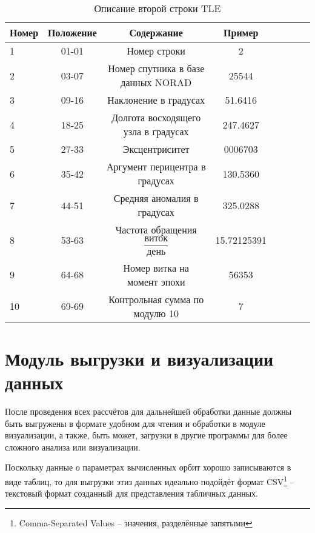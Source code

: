 \begin{table}[]
\centering
\caption{Описание второй строки TLE}
\label{tab:tle-str-2}
\begin{tabular}{l*{6}{c}r}
	Номер 	& Положение 	& Содержание			& Пример\\
	\hline
	1  & 01-01 & Номер строки                        & 2           \\
	2  & 03-07 & Номер спутника в базе данных NORAD  & 25544       \\
	3  & 09-16 & Наклонение в градусах               & 51.6416     \\
	4  & 18-25 & Долгота восходящего узла в градусах & 247.4627    \\
	5  & 27-33 & Эксцентриситет                      & 0006703     \\
	6  & 35-42 & Аргумент перицентра в градусах      & 130.5360    \\
	7  & 44-51 & Средняя аномалия в градусах         & 325.0288    \\
	8  & 53-63 & Частота обращения $\dfrac{\text{виток}}{\text{день}}$              & 15.72125391 \\
	9  & 64-68 & Номер витка на момент эпохи         & 56353       \\
	10 & 69-69 & Контрольная сумма по модулю 10      & 7          
\end{tabular}
\end{table}
\newpage


\section{Модуль выгрузки и визуализации данных}

После проведения всех рассчётов для дальнейшей обработки данные должны быть выгружены в формате удобном для чтения 
и обработки в модуле визуализации, а также, быть может, загрузки в другие программы для более сложного анализа или
визуализации.

Поскольку данные о параметрах вычисленных орбит хорошо записываются в виде таблиц, то для выгрузки этиз данных 
идеально подойдёт формат CSV\footnote{Comma-Separated Values -- значения, разделённые запятыми} -- текстовый формат
созданный для представления табличных данных.

